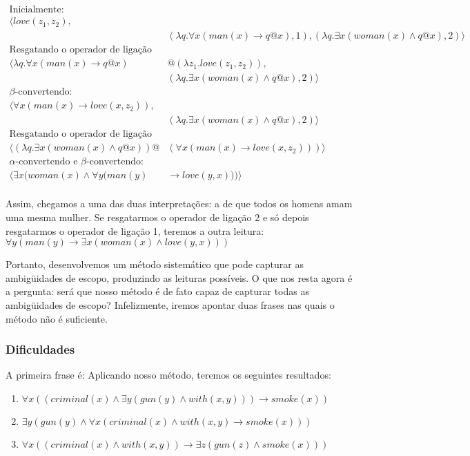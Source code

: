 \begin{align*}
 \text{Inicialmente:} \\
 \langle love(z_1,z_2),& \\ &(\lambda q. \forall x(man(x) \rightarrow q@x), 1),  (\lambda q. \exists x(woman(x) \land q@x),2) \rangle \\
 \text{Resgatando o operador de ligação 1:}  \\
 \langle \lambda q. \forall x(man(x) \rightarrow q@x) &@ (\lambda z_1 . love(z_1,z_2)),  \\&(\lambda q. \exists x(woman(x) \land q@x),2)\rangle \\
 \beta\text{-convertendo:} \\
 \langle \forall x (man(x) \rightarrow love(x,z_2)), &\\&(\lambda q. \exists x(woman(x) \land q@x),2)\rangle \\
 \text{Resgatando o operador de ligação 2:} \\
 \langle (\lambda q. \exists x(woman(x) \land q@x))@&(\forall x (man(x) \rightarrow love(x,z_2))) \rangle  \\
 \alpha\text{-convertendo e }  \beta\text{-convertendo:} \\
 \langle \exists x (woman(x) \land \forall y(man(y) &\rightarrow love(y,x))) \rangle  \\
\end{align*}

Assim, chegamos a uma das duas interpretações: a de que todos os homens amam uma mesma mulher. Se resgatarmos o operador de ligação 2 e só depois resgatarmos o operador de ligação 1, teremos a outra leitura: $\forall y(man(y) \rightarrow \exists x (woman (x) \land love(y,x)))$

Portanto, desenvolvemos um método sistemático que pode capturar as ambigüidades de escopo, produzindo as leituras possíveis. O que nos resta agora é a pergunta: será que nosso método é de fato capaz de capturar todas as ambigüidades de escopo? Infelizmente, iremos apontar duas frases nas quais o método não é suficiente. 

\subsubsection{Dificuldades}

A primeira frase é:  Aplicando nosso método, teremos os seguintes resultados:
\begin{enumerate}
\item $\forall x((criminal(x) \land \exists y (gun(y) \land with(x,y))) \rightarrow smoke(x))$
\item $\exists y(gun(y) \land \forall x(criminal(x) \land with(x,y) \rightarrow smoke(x)))$
\item $\forall x((criminal(x) \land with(x,y)) \rightarrow \exists z(gun(z) \land smoke(x))) $
\end{enumerate}

